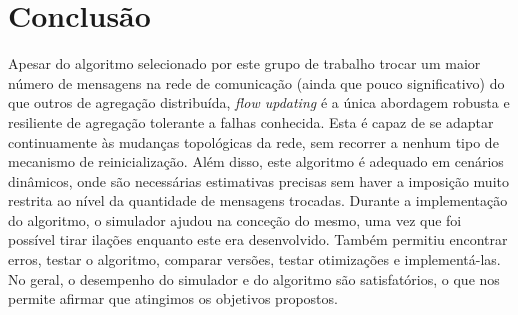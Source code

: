 \documentclass[a4paper]{report}
\begin{document}
{\let\clearpage\relax \chapter{Conclusão} \label{ch:Conclusion}}
\large{
	Apesar do algoritmo selecionado por este grupo de trabalho trocar um maior número de mensagens na rede de comunicação (ainda que pouco significativo) do que outros de agregação distribuída, \textit{flow updating} é a única abordagem robusta e resiliente de agregação tolerante a falhas conhecida.
	Esta é capaz de se adaptar continuamente às mudanças topológicas da rede, sem recorrer a nenhum tipo de mecanismo de reinicialização. Além disso, este algoritmo é adequado em cenários dinâmicos, onde são necessárias estimativas precisas sem haver a imposição muito restrita ao nível da quantidade de mensagens trocadas.
	Durante a implementação do algoritmo, o simulador ajudou na conceção do mesmo, uma vez que foi possível tirar ilações enquanto este era desenvolvido. 
	Também permitiu encontrar erros, testar o algoritmo, comparar versões, testar otimizações e implementá-las.
	No geral, o desempenho do simulador e do algoritmo são satisfatórios, o que nos permite afirmar que atingimos os objetivos propostos.
}

\printbibliography[heading=bibintoc]
\end{document}
